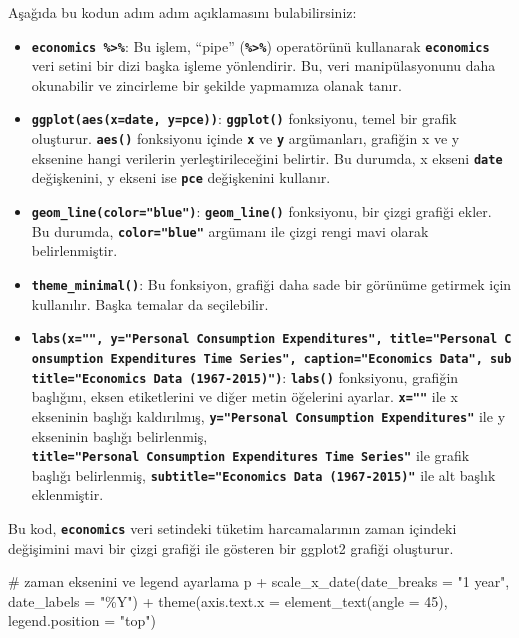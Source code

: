 \documentclass[
  letterpaper,
  DIV=11,
  numbers=noendperiod]{scrreprt}
\newenvironment{Shaded}{\begin{snugshade}}{\end{snugshade}}
\newcommand{\AttributeTok}[1]{\textcolor[rgb]{0.40,0.45,0.13}{#1}}
\newcommand{\CommentTok}[1]{\textcolor[rgb]{0.37,0.37,0.37}{#1}}
\newcommand{\DecValTok}[1]{\textcolor[rgb]{0.68,0.00,0.00}{#1}}
\newcommand{\FunctionTok}[1]{\textcolor[rgb]{0.28,0.35,0.67}{#1}}
\newcommand{\NormalTok}[1]{\textcolor[rgb]{0.00,0.23,0.31}{#1}}
\newcommand{\SpecialCharTok}[1]{\textcolor[rgb]{0.37,0.37,0.37}{#1}}
\newcommand{\StringTok}[1]{\textcolor[rgb]{0.13,0.47,0.30}{#1}}
\begin{document}
Aşağıda bu kodun adım adım açıklamasını bulabilirsiniz:

\begin{itemize}
\item
  \textbf{\texttt{economics\ \%\textgreater{}\%}}: Bu işlem, ``pipe''
  (\textbf{\texttt{\%\textgreater{}\%}}) operatörünü kullanarak
  \textbf{\texttt{economics}} veri setini bir dizi başka işleme
  yönlendirir. Bu, veri manipülasyonunu daha okunabilir ve zincirleme
  bir şekilde yapmamıza olanak tanır.
\item
  \textbf{\texttt{ggplot(aes(x=date,\ y=pce))}}:
  \textbf{\texttt{ggplot()}} fonksiyonu, temel bir grafik oluşturur.
  \textbf{\texttt{aes()}} fonksiyonu içinde \textbf{\texttt{x}} ve
  \textbf{\texttt{y}} argümanları, grafiğin x ve y eksenine hangi
  verilerin yerleştirileceğini belirtir. Bu durumda, x ekseni
  \textbf{\texttt{date}} değişkenini, y ekseni ise \textbf{\texttt{pce}}
  değişkenini kullanır.
\item
  \textbf{\texttt{geom\_line(color="blue")}}:
  \textbf{\texttt{geom\_line()}} fonksiyonu, bir çizgi grafiği ekler. Bu
  durumda, \textbf{\texttt{color="blue"}} argümanı ile çizgi rengi mavi
  olarak belirlenmiştir.
\item
  \textbf{\texttt{theme\_minimal()}}: Bu fonksiyon, grafiği daha sade
  bir görünüme getirmek için kullanılır. Başka temalar da seçilebilir.
\item
  \textbf{\texttt{labs(x="",\ y="Personal\ Consumption\ Expenditures",\ title="Personal\ Consumption\ Expenditures\ Time\ Series",\ caption="Economics\ Data",\ subtitle="Economics\ Data\ (1967-2015)")}}:
  \textbf{\texttt{labs()}} fonksiyonu, grafiğin başlığını, eksen
  etiketlerini ve diğer metin öğelerini ayarlar. \textbf{\texttt{x=""}}
  ile x ekseninin başlığı kaldırılmış,
  \textbf{\texttt{y="Personal\ Consumption\ Expenditures"}} ile y
  ekseninin başlığı belirlenmiş,
  \textbf{\texttt{title="Personal\ Consumption\ Expenditures\ Time\ Series"}}
  ile grafik başlığı belirlenmiş,
  \textbf{\texttt{subtitle="Economics\ Data\ (1967-2015)"}} ile alt
  başlık eklenmiştir.
\end{itemize}

Bu kod, \textbf{\texttt{economics}} veri setindeki tüketim
harcamalarının zaman içindeki değişimini mavi bir çizgi grafiği ile
gösteren bir ggplot2 grafiği oluşturur.

\begin{Shaded}
\begin{Highlighting}[]
\CommentTok{\# zaman eksenini ve legend ayarlama}
\NormalTok{p }\SpecialCharTok{+} 
  \FunctionTok{scale\_x\_date}\NormalTok{(}\AttributeTok{date\_breaks =} \StringTok{"1 year"}\NormalTok{, }\AttributeTok{date\_labels =} \StringTok{"\%Y"}\NormalTok{) }\SpecialCharTok{+}
  \FunctionTok{theme}\NormalTok{(}\AttributeTok{axis.text.x =} \FunctionTok{element\_text}\NormalTok{(}\AttributeTok{angle =} \DecValTok{45}\NormalTok{), }\AttributeTok{legend.position =} \StringTok{"top"}\NormalTok{)}
\end{Highlighting}
\end{Shaded}
\end{document}

